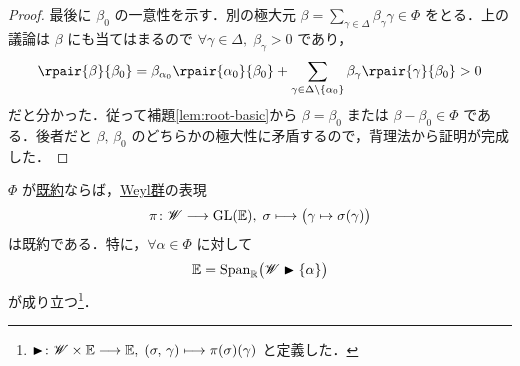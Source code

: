 \documentclass[rep_main]{subfiles}
\begin{document}
\begin{proof}
	最後に $\beta_0$ の一意性を示す．別の極大元 $\beta = \sum_{\gamma \in \Delta} \beta_\gamma \gamma \in \Phi$ をとる．上の議論は $\beta$ にも当てはまるので $\forall \gamma \in \Delta,\; \beta_\gamma > 0$ であり，
	\begin{align}
		\rpair{\beta}{\beta_0} = \beta_{\alpha_0} \rpair{\alpha_0}{\beta_0} + \sum_{\gamma \in \Delta \setminus \{\alpha_0\}} \beta_\gamma \rpair{\gamma}{\beta_0} > 0
	\end{align}
	だと分かった．従って補題\ref{lem:root-basic}から $\beta = \beta_0$ または $\beta - \beta_0 \in \Phi$ である．後者だと $\beta,\, \beta_0$ のどちらかの極大性に矛盾するので，背理法から証明が完成した．
\end{proof}


\begin{mylem}[label=lem:irr-root-B]{}
	$\Phi$ が\hyperref[def:irr-root]{既約}ならば，\hyperref[def:Weylgroup]{Weyl群}の表現
	\begin{align}
		\pi \colon \mathscr{W} \longrightarrow \mathrm{GL}(\mathbb{E}),\; \sigma \longmapsto \bigl( \gamma \mapsto \sigma(\gamma) \bigr) 
	\end{align}
	は既約である．特に，$\forall \alpha \in \Phi$ に対して
	\begin{align}
		\mathbb{E} = \operatorname{Span}_{\mathbb{R}} \bigl(\mathscr{W} \blacktriangleright \{\alpha\}\bigr)
	\end{align}
	が成り立つ\footnote{$\blacktriangleright \colon \mathscr{W} \times \mathbb{E} \longrightarrow \mathbb{E},\; (\sigma,\, \gamma) \longmapsto \pi(\sigma)(\gamma)$ と定義した．}．
\end{mylem}
\end{document}
